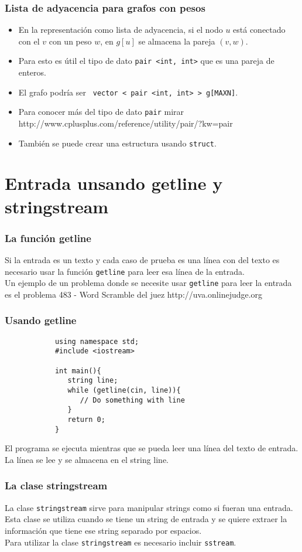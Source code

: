 \documentclass{beamer}
\begin{document}
	\begin{frame}[fragile]
		\frametitle{Lista de adyacencia para grafos con pesos}
		\begin{itemize}
			\item En la representación como lista de adyacencia, si el nodo $u$ está conectado con el $v$ con un peso $w$, en $g[u]$ se almacena la pareja $(v, w)$.
			\item Para esto es útil el tipo de dato \verb|pair <int, int>| que es una pareja de enteros.
			\item El grafo podría ser \verb| vector < pair <int, int> > g[MAXN]|.
			\item Para conocer más del tipo de dato \verb|pair| mirar http://www.cplusplus.com/reference/utility/pair/?kw=pair
			\item También se puede crear una estructura usando \verb|struct|.
		\end{itemize}
	\end{frame}

\section{Entrada unsando getline y stringstream}

	\begin{frame}[fragile]
		\frametitle{La función getline}
		Si la entrada es un texto y cada caso de prueba es una línea con del texto es necesario usar la función \verb|getline| para leer esa línea de la entrada. \\
		Un ejemplo de un problema donde se necesite usar \verb|getline| para leer la entrada es el problema 483 - Word Scramble del juez http://uva.onlinejudge.org
	\end{frame}
	
	\begin{frame}[fragile]
		\frametitle{Usando getline}
		\begin{lstlisting}
			using namespace std;
			#include <iostream>
			
			int main(){
			   string line;
			   while (getline(cin, line)){
			      // Do something with line
			   }
			   return 0;
			}
		\end{lstlisting}
		El programa se ejecuta mientras que se pueda leer una línea del texto de entrada. La línea se lee y se almacena en el string line.
	\end{frame}
	
	\begin{frame}[fragile]
		\frametitle{La clase stringstream}
		La clase \verb|stringstream| sirve para manipular strings como si fueran una entrada.\\
		Esta clase se utiliza cuando se tiene un string de entrada y se quiere extraer la información que tiene ese string separado por espacios.\\
		Para utilizar la clase \verb|stringstream| es necesario incluir \verb|sstream|.		
	\end{frame}
	
\end{document}

